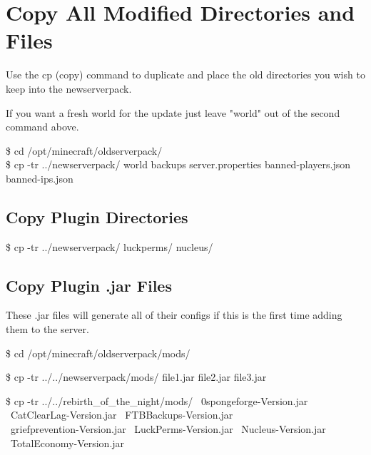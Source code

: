\documentclass{report}
\begin{document}
\section{Copy All Modified Directories and Files}
Use the cp (copy) command to duplicate and place the old directories you wish to keep into the newserverpack.

\begin{mdframed}[style=Note]
If you want a fresh world for the update just leave "world" out of the second command above.
\end{mdframed}

\begin{mdframed}[style=Code]
	\$ cd /opt/minecraft/oldserverpack/\\
	\$ cp -tr ../newserverpack/ world backups server.properties
	 banned-players.json banned-ips.json 
\end{mdframed}

\subsection{Copy Plugin Directories}
\begin{mdframed}[style=Code]
	\$ cp -tr ../newserverpack/ luckperms/ nucleus/
\end{mdframed}

\subsection{Copy Plugin .jar Files}
These .jar files will generate all of their configs if this is the first time adding them to the server.

\begin{mdframed}[style=Code, frametitle=Move Current Directory]
	\$ cd /opt/minecraft/oldserverpack/mods/
\end{mdframed}

\begin{mdframed}[style=Code, frametitle=Generic Example]
	\$ cp -tr ../../newserverpack/mods/ file1.jar file2.jar file3.jar 
\end{mdframed}

\begin{mdframed}[style=Code, frametitle=Real Example]
	\$ cp -tr ../../rebirth\_of\_the\_night/mods/ ~0spongeforge-Version.jar\\
	  ~CatClearLag-Version.jar ~FTBBackups-Version.jar\\
	  ~griefprevention-Version.jar ~LuckPerms-Version.jar ~Nucleus-Version.jar\\ 			      ~TotalEconomy-Version.jar
\end{mdframed}
\end{document}
